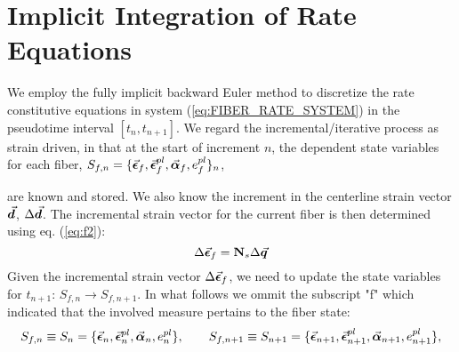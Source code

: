 \section{Implicit Integration of Rate Equations}\label{section:CH3-S4}

We employ the fully implicit backward Euler method to discretize the rate
constitutive equations in system (\ref{eq:FIBER_RATE_SYSTEM}) in the pseudotime
interval $[t_n,t_{n+1}]$. We regard the incremental/iterative process as strain
driven, in that at the start of increment $n$, the dependent state variables 
for each fiber,
$S_{f,n}=\{\vec{\bm{\epsilon}}_f,\vec{\bm{\epsilon}}_f^{pl},\vec{\bm{\alpha}}_f,e_f^{pl}\}_n$,
 
are
known and stored. We also know the increment in the centerline strain vector
$\vec{\bm{d}}$, $\Delta\vec{\bm{d}}$. The incremental strain vector for the current
fiber is then determined using eq. (\ref{eq:f2}):
\begin{equation*}
	\Delta\vec{\bm{\epsilon}}_f = \mathbf{N}_s\Delta\vec{\bm{q}}
	\label{eq:INCREMENTAL_STRAINS}
\end{equation*}
Given the incremental strain vector $\Delta\vec{\bm{\epsilon}}_f$, 
we need to update the state variables for $t_{n+1}$:  $S_{f,n}\rightarrow 
S_{f,n+1}$.
In what follows we ommit the subscript "f" which indicated that the involved 
measure pertains to the fiber state: 
\begin{equation*}
	S_{f,n} \equiv S_n = 
	\{\vec{\bm{\epsilon}}_n,\vec{\bm{\epsilon}}_n^{pl},\vec{\bm{\alpha}}_n,e_n^{pl}\},\qquad
	S_{f,n+1} \equiv S_{n+1} =
	\{\vec{\bm{\epsilon}}_{n+1},\vec{\bm{\epsilon}}_{n+1}^{pl},\vec{\bm{\alpha}}_{n+1},e_{n+1}^{pl}\},
\end{equation*}

